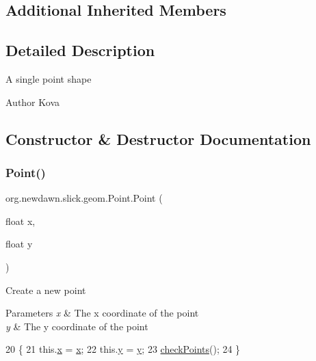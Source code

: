 \subsection*{Additional Inherited Members}


\subsection{Detailed Description}
A single point shape

\begin{DoxyAuthor}{Author}
Kova 
\end{DoxyAuthor}


\subsection{Constructor \& Destructor Documentation}
\mbox{\label{classorg_1_1newdawn_1_1slick_1_1geom_1_1_point_a64fbbb67319dc26073ef25c688385009}} 
\subsubsection{\texorpdfstring{Point()}{Point()}}
{\footnotesize\ttfamily org.\+newdawn.\+slick.\+geom.\+Point.\+Point (\begin{DoxyParamCaption}\item[{float}]{x,  }\item[{float}]{y }\end{DoxyParamCaption})\hspace{0.3cm}{\ttfamily [inline]}}

Create a new point


\begin{DoxyParams}{Parameters}
{\em x} & The x coordinate of the point \\
\hline
{\em y} & The y coordinate of the point \\
\hline
\end{DoxyParams}

\begin{DoxyCode}
20     \{ 
21         this.\mbox{\hyperlink{classorg_1_1newdawn_1_1slick_1_1geom_1_1_shape_a3e985bfff386c15a4efaad03d8ad60d3}{x}} = \mbox{\hyperlink{classorg_1_1newdawn_1_1slick_1_1geom_1_1_shape_a3e985bfff386c15a4efaad03d8ad60d3}{x}}; 
22         this.\mbox{\hyperlink{classorg_1_1newdawn_1_1slick_1_1geom_1_1_shape_a9f934baded6a1b65ebb69e7e5f80ea00}{y}} = \mbox{\hyperlink{classorg_1_1newdawn_1_1slick_1_1geom_1_1_shape_a9f934baded6a1b65ebb69e7e5f80ea00}{y}}; 
23         \mbox{\hyperlink{classorg_1_1newdawn_1_1slick_1_1geom_1_1_shape_a84293802d05e8666a441720bfc12745d}{checkPoints}}(); 
24     \} 
\end{DoxyCode}



